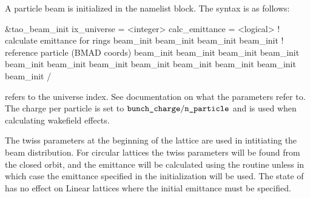 A particle beam is initialized in the  namelist block.
The syntax is as follows:
\begin{example}
  &tao_beam_init
    ix_universe             = <integer>
    calc_emittance          = <logical>   ! calculate emittance for rings
    beam_init%
    beam_init%
    beam_init%
    beam_init%
                                          ! reference particle (BMAD coords)
    beam_init%
    beam_init%
    beam_init%
    beam_init%
    beam_init%
    beam_init%
    beam_init%
    beam_init%
    beam_init%
    beam_init%
    beam_init%
    beam_init%
  /
\end{example}
 refers to the universe index. See \bmad documentation on what
the  parameters refer to.  The charge per particle is set to
$\vn{bunch_charge} / \vn{n_particle}$ and is used when calculating wakefield
effects.

The twiss parameters at the beginning of the lattice are used in
intitiating the beam distribution.  For circular lattices the twiss
parameters will be found from the closed orbit, and the emittance will
be calculated using the \bmad routine  unless
 in which case the emittance specified in the
initialization will be used. The state of  has no
effect on Linear lattices where the initial emittance must be
specified.

